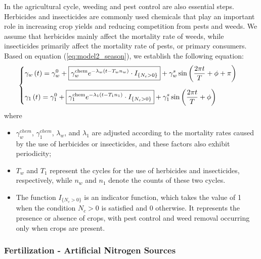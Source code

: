 \documentclass{mcmthesis}
\begin{document}
In the agricultural cycle, weeding and pest control are also essential steps. Herbicides and insecticides are commonly used chemicals that play an important role in increasing crop yields and reducing competition from pests and weeds. We assume that herbicides mainly affect the mortality rate of weeds, while insecticides primarily affect the mortality rate of pests, or primary consumers. Based on equation (\ref{eq:model2_season}), we establish the following equation:
\begin{align}
\begin{cases}    
    \displaystyle \vspace{10pt}
    \gamma _w\left( t \right) =\gamma _{w}^{0}+
    \boxed{\gamma _{w}^{\text{chem}} e^{-\lambda _w\left( t-T_wn_w \right)}\cdot I_{\{N_c > 0\}}}
    +\gamma _{w}^{s}\sin \left( \frac{2\pi t}{T}+\phi + \pi \right) 
    \\\displaystyle
    \gamma _1\left( t \right) =\gamma _{1}^{0}
    +\boxed{\gamma _{1}^{\text{chem}}e^{-\lambda _1\left( t-T_1n_1 \right)}\cdot I_{\{N_c > 0\}}} 
    + \gamma_1^{s}\sin \left( \frac{2\pi t}{T}+\phi \right)
    \end{cases}
    \label{eq:model2_chem_deathRate}
\end{align}
where
\begin{itemize}  
    \item $\gamma_w^{chem}$, $\gamma_1^{chem}$, $\lambda_w$, and $\lambda_1$ are adjusted according to the mortality rates caused by the use of herbicides or insecticides, and these factors also exhibit periodicity;  
    \item $T_w$ and $T_1$ represent the cycles for the use of herbicides and insecticides, respectively, while $n_w$ and $n_1$ denote the counts of these two cycles.  
    \item The function $I_{\{N_c > 0\}}$ is an indicator function, which takes the value of 1 when the condition $N_c > 0$ is satisfied and 0 otherwise. It represents the presence or absence of crops, with pest control and weed removal occurring only when crops are present.  
\end{itemize}  

\subsubsection{Fertilization - Artificial Nitrogen Sources}
\end{document}
